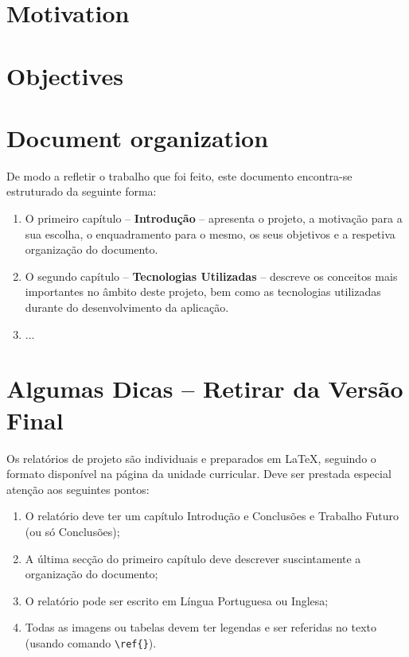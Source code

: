 \documentclass[titlepage,12pt,a4paper,times]{book}
\begin{document}
\section{Motivation}
\label{sec:mot}

\section{Objectives}
\label{sec:obj}

\section{Document organization}
\label{sec:organ}
De modo a refletir o trabalho que foi feito, este documento encontra-se
estruturado da seguinte forma:
\begin{enumerate}
\item O primeiro capítulo -- \textbf{Introdução} -- apresenta o projeto, a
	motivação para a sua escolha, o enquadramento para o mesmo, os seus
	objetivos e a respetiva organização do documento.
\item O segundo capítulo -- \textbf{Tecnologias Utilizadas} -- descreve os
	conceitos mais importantes no âmbito deste projeto, bem como as tecnologias
	utilizadas durante do desenvolvimento da aplicação.
\item ...
\end{enumerate}

%
\section{Algumas Dicas -- Retirar da Versão Final}
Os relatórios de projeto são individuais e preparados em \LaTeX, seguindo o
formato disponível na página da unidade curricular. Deve ser prestada especial
atenção aos seguintes pontos:
\begin{enumerate}
  \item O relatório deve ter um capítulo Introdução e Conclusões e Trabalho
	  Futuro (ou só Conclusões);
  \item A última secção do primeiro capítulo deve descrever suscintamente a
	  organização do documento;
  \item O relatório pode ser escrito em Língua Portuguesa ou Inglesa;
  \item Todas as imagens ou tabelas devem ter legendas e ser referidas no texto
	  (usando comando \texttt{\textbackslash ref\{\}}).
\end{enumerate}
\end{document}
